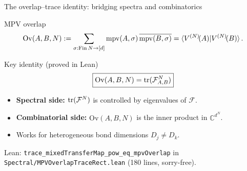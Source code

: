 \documentclass[aspectratio=169,10pt]{beamer}
\newcommand{\cF}{\mathcal{F}}
\newcommand{\Ov}{\mathrm{Ov}}
\begin{document}
\begin{frame}{The overlap--trace identity: bridging spectra and combinatorics}
    \vspace{-0.6em}

    \begin{block}{MPV overlap}
        \vspace{-0.5em}
        \[
            \Ov(A,B,N) :=  \sum_{\sigma:\mathrm{Fin}\,N\to[d]} \mathrm{mpv}(A,\sigma)\, \overline{\mathrm{mpv}(B,\sigma)}
            = \braket{V^{(N)}\!(A)|V^{(N)}\!(B)}.
        \]
    \end{block}

    \begin{block}{Key identity (proved in Lean)}
        \[
            \boxed{ \Ov(A,B,N) =  \tr(\cF_{A,B}^N) }
        \]
        \vspace{-0.8em}
        \begin{itemize}\itemsep0.15em
            \item \textbf{Spectral side:} $\tr(\cF^N)$ is controlled by eigenvalues of $\cF$.
            \item \textbf{Combinatorial side:} $\Ov(A,B,N)$ is the inner product in $\mathbb{C}^{d^N}$.
            \item Works for \alert{heterogeneous bond dimensions} $D_j \neq D_k$.
        \end{itemize}
    \end{block}

    \textcolor{dimwhite}{\footnotesize Lean: \texttt{trace\_mixedTransferMap\_pow\_eq\_mpvOverlap}
        in \texttt{Spectral/MPVOverlapTraceRect.lean} (180 lines, sorry-free).}
\end{frame}
\end{document}
